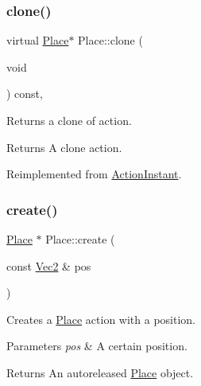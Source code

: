 \subsubsection{\texorpdfstring{clone()}{clone()}\hspace{0.1cm}{\footnotesize\ttfamily [2/2]}}
{\footnotesize\ttfamily virtual \hyperlink{classPlace}{Place}$\ast$ Place\+::clone (\begin{DoxyParamCaption}\item[{void}]{ }\end{DoxyParamCaption}) const\hspace{0.3cm}{\ttfamily [override]}, {\ttfamily [virtual]}}

Returns a clone of action.

\begin{DoxyReturn}{Returns}
A clone action. 
\end{DoxyReturn}


Reimplemented from \hyperlink{classActionInstant_adb76fc6f006098109e8256210cbd8cc0}{Action\+Instant}.

\mbox{\label{classPlace_a95f2da72e9f2cdc96add109fb4027288}} 
\subsubsection{\texorpdfstring{create()}{create()}\hspace{0.1cm}{\footnotesize\ttfamily [1/2]}}
{\footnotesize\ttfamily \hyperlink{classPlace}{Place} $\ast$ Place\+::create (\begin{DoxyParamCaption}\item[{const \hyperlink{classVec2}{Vec2} \&}]{pos }\end{DoxyParamCaption})\hspace{0.3cm}{\ttfamily [static]}}

Creates a \hyperlink{classPlace}{Place} action with a position.


\begin{DoxyParams}{Parameters}
{\em pos} & A certain position. \\
\hline
\end{DoxyParams}
\begin{DoxyReturn}{Returns}
An autoreleased \hyperlink{classPlace}{Place} object. 
\end{DoxyReturn}
\mbox{\label{classPlace_ac113343dc30a5e1c8ff4a097885334b3}} 
